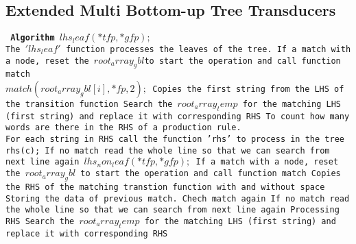 \subsection{Extended Multi Bottom-up Tree Transducers}
\vbox
{\tt \obeylines
{\bf Algorithm}
\hspace*{1em}   $lhs_leaf(*tfp,*gfp);$\\
  The $'lhs_leaf'$ function processes the leaves of the tree.
\hspace*{1em} If a match with a node, reset the $root_array_gbl $to start the operation and call function match\\      
 $match(root_array_gbl[i],*fp,2);$        
\hspace*{2em}Copies the first string from the LHS of the transition function          
\hspace*{2em}Search the $root_array_temp$ for the matching LHS (first string) and replace it with corresponding RHS            
\hspace*{2em}To count how many words are there in the RHS of a production rule.\\      
  For each string in RHS call the function 'rhs' to process in the tree\\   
   rhs(c);
\hspace*{2em}If no match read the whole line so that we can search from next line again
\hspace*{2em} $ lhs_non_leaf(*tfp,*gfp);$
\hspace*{2em}  If a match with a node, reset the $root_array_gbl$ to start the operation and call function match
\hspace*{2em}  Copies the RHS of the matching transtion function with and without space
\hspace*{2em} Storing the data of previous match. 
\hspace*{2em} Chech match again
\hspace*{2em}  If no match read the whole line so that we can search from next line again
\hspace*{2em} Processing RHS
\hspace*{2em}Search the $root_array_temp$ for the matching LHS (first string) and replace it with corresponding RHS
}
